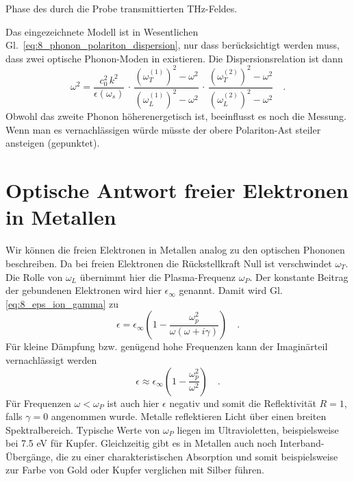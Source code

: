 \begin{marginfigure}
    \caption{Phase des durch die Probe transmittierten THz-Feldes. \label{fig:8_kojima_phase}
    }
\end{marginfigure}

Das eingezeichnete Modell ist in Wesentlichen Gl.~\ref{eq:8_phonon_polariton_dispersion}, nur dass berücksichtigt werden muss, dass zwei optische Phonon-Moden in  existieren. Die Dispersionsrelation ist dann
\begin{equation}
    \omega^2 = \frac{c_0^2 \, k^2}{\epsilon(\omega_s)} \, \cdot  \,
    \frac{\left(\omega_T^{(1)} \right)^2 - \omega^2}{   \left(\omega_L^{(1)} \right)^2 - \omega^2 }  \, \cdot \,
    \frac{\left(\omega_T^{(2)} \right)^2 - \omega^2}{   \left(\omega_L^{(2)} \right)^2 - \omega^2}  \quad .
\end{equation}
Obwohl das zweite Phonon höherenergetisch ist, beeinflusst es noch die Messung. Wenn man es vernachlässigen würde müsste der obere Polariton-Ast steiler ansteigen (gepunktet).



\section*{Optische Antwort freier Elektronen in Metallen}


Wir können die freien Elektronen in Metallen analog zu den optischen Phononen beschreiben. Da bei freien Elektronen die Rückstellkraft Null ist verschwindet $\omega_T$. Die Rolle von $\omega_L$ übernimmt hier die Plasma-Frequenz $\omega_P$. Der konstante Beitrag der gebundenen Elektronen wird hier $\epsilon_\infty$ genannt. Damit wird Gl. \ref{eq:8_eps_ion_gamma} zu
\begin{equation}
    \epsilon     = \epsilon_\infty \left(1  - \frac{\omega_p^2}{\omega(\omega + i  \gamma)} \right) \quad .
     \label{eq:8_eps_metall_gamma}
\end{equation}
Für kleine Dämpfung bzw. genügend hohe Frequenzen kann der Imaginärteil vernachlässigt werden
\begin{equation}
    \epsilon \approx  \epsilon_\infty \left( 1  - \frac{\omega_p^2}{\omega^2} \right) \quad .
\end{equation}
Für Frequenzen $\omega < \omega_P$ ist auch hier $\epsilon$ negativ und somit die Reflektivität $R=1$, falls $\gamma = 0$ angenommen wurde. Metalle reflektieren Licht über einen breiten Spektralbereich. Typische Werte von $\omega_P$ liegen im Ultravioletten, beispielsweise bei 7.5 eV für Kupfer. Gleichzeitig gibt es in Metallen auch noch Interband-Übergänge, die zu einer charakteristischen Absorption und somit beispielsweise zur Farbe von Gold oder Kupfer verglichen mit Silber führen.

